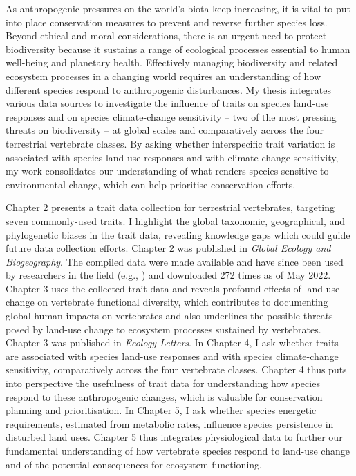 As anthropogenic pressures on the world’s biota keep increasing, it is vital to put into place conservation measures to prevent and reverse further species loss. Beyond ethical and moral considerations, there is an urgent need to protect biodiversity because it sustains a range of ecological processes essential to human well-being and planetary health. Effectively managing biodiversity and related ecosystem processes in a changing world requires an understanding of how different species respond to anthropogenic disturbances. My thesis integrates various data sources to investigate the influence of traits on species land-use responses and on species climate-change sensitivity -- two of the most pressing threats on biodiversity -- at global scales and comparatively across the four terrestrial vertebrate classes. By asking whether interspecific trait variation is associated with species land-use responses and with climate-change sensitivity, my work consolidates our understanding of what renders species sensitive to environmental change, which can help prioritise conservation efforts. 
 
Chapter 2 presents a trait data collection for terrestrial vertebrates, targeting seven commonly-used traits. I highlight the global taxonomic, geographical, and phylogenetic biases in the trait data, revealing knowledge gaps which could guide future data collection efforts. Chapter 2 was published in \textit{Global Ecology and Biogeography}. The compiled data were made available and have since been used by researchers in the field (e.g., \citet{Capdevila2022}) and downloaded 272 times as of May 2022.  Chapter 3 uses the collected trait data and reveals profound effects of land-use change on vertebrate functional diversity, which contributes to documenting global human impacts on vertebrates and also underlines the possible threats posed by land-use change to ecosystem processes sustained by vertebrates. Chapter 3 was published in \textit{Ecology Letters}. In Chapter 4, I ask whether traits are associated with species land-use responses and with species climate-change sensitivity, comparatively across the four vertebrate classes. Chapter 4 thus puts into perspective the usefulness of trait data for understanding how species respond to these anthropogenic changes, which is valuable for conservation planning and prioritisation. In Chapter 5, I ask whether species energetic requirements, estimated from metabolic rates, influence species persistence in disturbed land uses. Chapter 5 thus integrates physiological data to further our fundamental understanding of how vertebrate species respond to land-use change and of the potential consequences for ecosystem functioning. 

